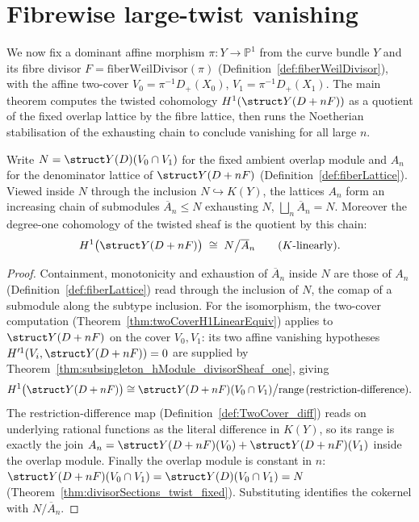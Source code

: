 \section{Fibrewise large-twist vanishing}

We now fix a dominant affine morphism \(\pi \colon Y \to \mathbb P^1\) from the curve bundle \(Y\)
and its fibre divisor \(F = \mathrm{fiberWeilDivisor}(\pi)\) (Definition~\ref{def:fiberWeilDivisor}),
with the affine two-cover \(V_0 = \pi^{-1}D_+(X_0)\), \(V_1 = \pi^{-1}D_+(X_1)\). The main theorem
computes the twisted cohomology \(H^1(\struct Y(D + nF))\) as a quotient of the fixed overlap
lattice by the fibre lattice, then runs the Noetherian stabilisation of the exhausting chain to
conclude vanishing for all large \(n\).

\begin{definition}
  \label{def:fiberLatticeH1Equiv}
  \leanok
  Write \(N = \struct Y(D)(V_0 \cap V_1)\) for the fixed ambient overlap module and \(A_n\) for the
  denominator lattice of \(\struct Y(D + nF)\) (Definition~\ref{def:fiberLattice}). Viewed inside
  \(N\) through the inclusion \(N \hookrightarrow K(Y)\), the lattices \(A_n\) form an increasing
  chain of submodules \(\overline A_n \le N\) exhausting \(N\), \(\bigsqcup_n \overline A_n = N\).
  Moreover the degree-one cohomology of the twisted sheaf is the quotient by this chain:
  \[
    H^1\bigl(\struct Y(D + nF)\bigr) \;\cong\; N \big/ \overline A_n \qquad (K\text{-linearly}).
  \]
\end{definition}
\begin{proof}
  \leanok
  Containment, monotonicity and exhaustion of \(\overline A_n\) inside \(N\) are those of \(A_n\)
  (Definition~\ref{def:fiberLattice}) read through the inclusion of \(N\), the comap of a submodule
  along the subtype inclusion. For the isomorphism, the two-cover computation
  (Theorem~\ref{thm:twoCoverH1LinearEquiv}) applies to \(\struct Y(D + nF)\) on the cover \(V_0,
  V_1\): its two affine vanishing hypotheses \(H'^1(V_i, \struct Y(D + nF)) = 0\) are supplied by
  Theorem~\ref{thm:subsingleton_hModule_divisorSheaf_one}, giving
  \[
    H^1\bigl(\struct Y(D + nF)\bigr) \cong \struct Y(D + nF)(V_0 \cap V_1) \big/
      \mathrm{range}\,(\text{restriction-difference}) .
  \]
  The restriction-difference map (Definition~\ref{def:TwoCover_diff}) reads on underlying rational
  functions as the literal difference in \(K(Y)\), so its range is exactly the join \(A_n = \struct
  Y(D + nF)(V_0) + \struct Y(D + nF)(V_1)\) inside the overlap module. Finally the overlap module is
  constant in \(n\): \(\struct Y(D + nF)(V_0 \cap V_1) = \struct Y(D)(V_0 \cap V_1) = N\)
  (Theorem~\ref{thm:divisorSections_twist_fixed}). Substituting identifies the cokernel with \(N /
  \overline A_n\).
\end{proof}

